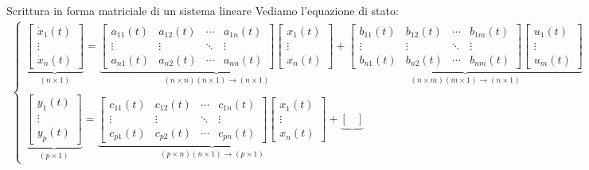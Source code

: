 \documentclass[a4paper]{report}
\begin{document}
\begin{defin}{Scrittura in forma matriciale di un sistema lineare}{}
	Vediamo l'equazione di stato:
	\begin{align}
		\begin{cases}\underbrace{\begin{bmatrix}
			\dot x_1(t) \\
			\vdots \\
			\dot x_n(t)
		\end{bmatrix}}_{(n\times 1)} = 
		\underbrace{\begin{bmatrix}
			a_{11}(t) & a_{12}(t) & \cdots &a_{1n}(t) \\
			\vdots & \vdots & \ddots & \vdots \\
			a_{n1}(t) & a_{n2}(t) & \cdots &a_{nn}(t)
		\end{bmatrix} \begin{bmatrix}
			x_1(t) \\ \vdots \\ x_n(t)
		\end{bmatrix}}_{(n \times n)(n\times 1) \rightarrow (n\times 1)} + \underbrace{\begin{bmatrix}
			b_{11}(t) & b_{12}(t) & \cdots &b_{1m}(t) \\
			\vdots & \vdots & \ddots & \vdots \\
			b_{n1}(t) & b_{n2}(t) & \cdots &b_{nm}(t)
		\end{bmatrix} \begin{bmatrix}
			u_1(t) \\ \vdots \\ u_m(t)
		\end{bmatrix}}_{(n \times m)(m\times 1) \rightarrow (n\times 1)}
\\
\\
		\underbrace{
			\begin{bmatrix}
			y_1(t) \\ \vdots \\ y_p(t)
			\end{bmatrix}}_{(p\times 1)} = 
		\underbrace{\begin{bmatrix}
			c_{11}(t) & c_{12}(t) & \cdots &c_{1n}(t) \\
			\vdots & \vdots & \ddots & \vdots \\
			c_{p1}(t) & c_{p2}(t) & \cdots &c_{pn}(t)
		\end{bmatrix} \begin{bmatrix}
			x_1(t) \\ \vdots \\ x_n(t)
		\end{bmatrix}}_{(p \times n)(n\times 1) \rightarrow (p\times 1)} + \underbrace{\begin{bmatrix}

\end{bmatrix}}
\end{cases}
\end{align}
\end{defin}
\end{document}
